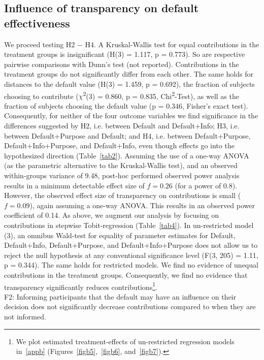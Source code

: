 \documentclass[review, authoryear,12pt]{elsarticle}
\begin{document}
\subsection{Influence of transparency on default effectiveness}
We proceed testing H2 $-$ H4. A Kruskal-Wallis test for equal contributions in the treatment groups is insignificant (H(3) = 1.117, p = 0.773). So are respective pairwise comparisons with Dunn's test (not reported). Contributions in the treatment groups do not significantly differ from each other. The same holds for distances to the default value (H(3) = 1.459, p = 0.692), the fraction of subjects choosing to contribute ($\chi$\textsuperscript{2}(3) = 0.860, p = 0.835, Chi\textsuperscript{2}-Test), as well as the fraction of subjects choosing the default value (p = 0.346, Fisher's exact test). Consequently, for neither of the four outcome variables we find significance in the differences suggested by H2, i.e. between Default and Default+Info; H3, i.e. between Default+Purpose and Default; and H4, i.e. between Default+Purpose, Default+Info+Purpose, and Default+Info, even though effects go into the hypothesized direction (Table~\ref{tab2}).
Assuming the use of a one-way ANOVA (as the parametric alternative to the Kruskal-Wallis test), and an observed within-groups variance of 9.48, post-hoc performed observed power analysis results in a minimum detectable effect size of $f = 0.26$ (for a power of 0.8). However, the observed effect size of transparency on contributions is small ($f = 0.09$), again assuming a one-way ANOVA. This results in an observed power coefficient of 0.14.
As above, we augment our analysis by focusing on contributions in stepwise Tobit-regression (Table~\ref{tab4}). In un-restricted model (3), an omnibus Wald-test for equality of parameter estimates for Default, Default+Info, Default+Purpose, and Default+Info+Purpose does not allow us to reject the null hypothesis at any conventional significance level (F(3, 205) = 1.11, p = 0.344). The same holds for restricted models. We find no evidence of unequal contributions in the treatment groups. Consequently, we find no evidence that transparency significantly reduces contributions\footnote{We plot estimated treatment-effects of un-restricted regression models in~\ref{appb} (Figures~\ref{figb5},~\ref{figb6}, and~\ref{figb7}).}. \\

F2: Informing participants that the default may have an influence on their decision does not significantly decrease contributions compared to when they are not informed.\\
\end{document}
